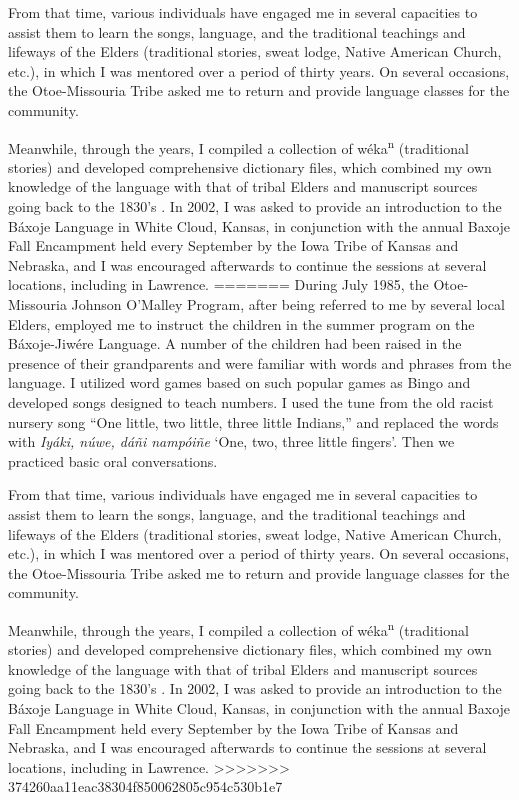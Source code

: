 \documentclass[output=paper]{LSP/langsci}
\begin{document}
From that time, various individuals have engaged me in several capacities to assist them to learn the songs, language, and the traditional teachings and lifeways of the Elders (traditional stories, sweat lodge, Native American Church, etc.), in which I was mentored over a period of thirty years. On several occasions, the Otoe-Missouria Tribe asked me to return and provide language classes for the community.  

Meanwhile, through the years, I compiled a collection of w\'eka\textsuperscript{n} (traditional stories) and developed comprehensive dictionary files, which combined my own knowledge of the language with that of tribal Elders and manuscript sources going back to the 1830's \citep{Goodtracks1992}. In 2002, I was asked to provide an introduction to the Báxoje Language in White Cloud, Kansas, in conjunction with the annual Baxoje Fall Encampment held every September by the Iowa Tribe of Kansas and Nebraska, and I was encouraged afterwards to continue the sessions at several locations, including in Lawrence. 
=======
During July 1985, the Otoe-Missouria Johnson O'Malley Program, after being referred to me by several local Elders, employed me to instruct the children in the summer program on the B\'axoje-Jiw\'ere Language. A number of the children had been raised in the presence of their grandparents and were familiar with words and phrases from the language. I utilized word games based on such popular games as Bingo and developed songs designed to teach numbers. I used the tune from the old racist nursery song ``One little, two little, three little Indians,'' and replaced the words with \emph{Iy\'aki, n\'uwe, d\'a\~ni namp\'oi\~ne} `One, two, three little fingers'. Then we practiced basic oral conversations.  

From that time, various individuals have engaged me in several capacities to assist them to learn the songs, language, and the traditional teachings and lifeways of the Elders (traditional stories, sweat lodge, Native American Church, etc.), in which I was mentored over a period of thirty years. On several occasions, the Otoe-Missouria Tribe asked me to return and provide language classes for the community.  

Meanwhile, through the years, I compiled a collection of w\'eka\textsuperscript{n} (traditional stories) and developed comprehensive dictionary files, which combined my own knowledge of the language with that of tribal Elders and manuscript sources going back to the 1830's \citep{Goodtracks1992}. In 2002, I was asked to provide an introduction to the B\'axoje Language in White Cloud, Kansas, in conjunction with the annual Baxoje Fall Encampment held every September by the Iowa Tribe of Kansas and Nebraska, and I was encouraged afterwards to continue the sessions at several locations, including in Lawrence. 
>>>>>>> 374260aa11eac38304f850062805c954c530b1e7
\end{document}
